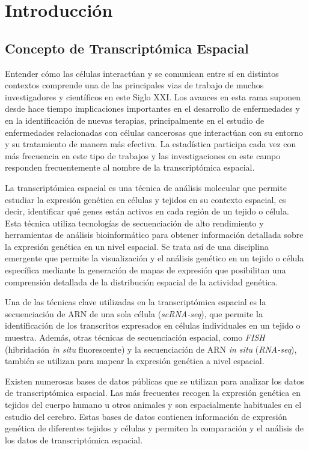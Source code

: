 \documentclass[12pt,oneside]{book} %
\begin{document}
\tableofcontents

\chapter{Introducción}
\section{Concepto de Transcriptómica Espacial}
Entender cómo las células interactúan y se comunican entre sí en distintos contextos comprende una de las principales vias de trabajo de muchos investigadores y científicos en este Siglo XXI. Los avances en esta rama suponen desde hace tiempo implicaciones importantes en el desarrollo de enfermedades y en la identificación de nuevas terapias, principalmente en el estudio de enfermedades relacionadas con células cancerosas que interactúan con su entorno y su tratamiento de manera más efectiva. La estadística participa cada vez con más frecuencia en este tipo de trabajos y las investigaciones en este campo responden frecuentemente al nombre de la transcriptómica espacial. 

La transcriptómica espacial es una técnica de análisis molecular que permite estudiar la expresión genética en células y tejidos en su contexto espacial, es decir, identificar qué genes están activos en cada región de un tejido o célula. Esta técnica utiliza tecnologías de secuenciación de alto rendimiento y herramientas de análisis bioinformático para obtener información detallada sobre la expresión genética en un nivel espacial. Se trata así de una disciplina emergente que permite la visualización y el análisis genético en un tejido o célula específica mediante la generación de mapas de expresión que posibilitan una comprensión detallada de la distribución espacial de la actividad genética.

Una de las técnicas clave utilizadas en la transcriptómica espacial es la secuenciación de ARN de una sola célula (\textit{scRNA-seq}), que permite la identificación de los transcritos expresados en células individuales en un tejido o muestra. Además, otras técnicas de secuenciación espacial, como \textit{FISH} (hibridación \textit{in situ} fluorescente) y la secuenciación de ARN \textit{in situ} (\textit{RNA-seq}), también se utilizan para mapear la expresión genética a nivel espacial.

\newpage

Existen numerosas bases de datos públicas que se utilizan para analizar los datos de transcriptómica espacial. Las más frecuentes recogen la expresión genética en tejidos del cuerpo humano u otros animales y son espacialmente habituales en el estudio del cerebro. Estas bases de datos contienen información de expresión genética de diferentes tejidos y células y permiten la comparación y el análisis de los datos de transcriptómica espacial. \\
\end{document}
